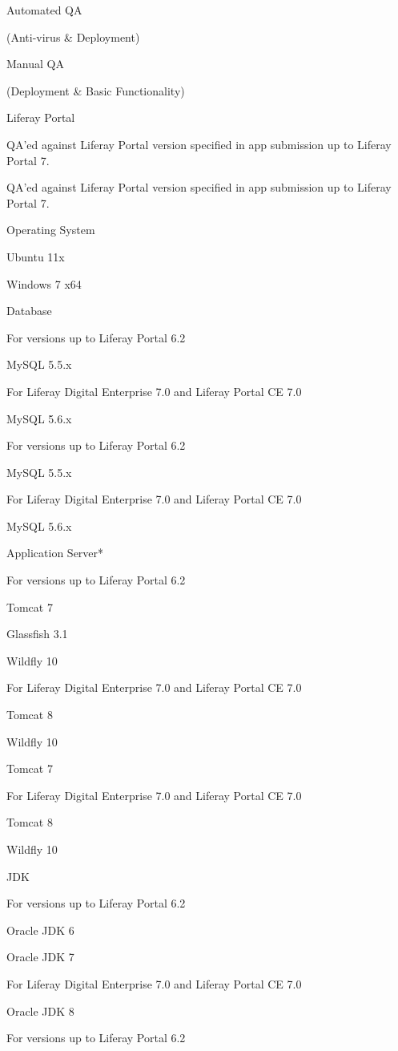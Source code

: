\label{article-33460919}
Automated QA

(Anti-virus \& Deployment)

Manual QA

(Deployment \& Basic Functionality)

Liferay Portal

QA'ed against Liferay Portal version specified in app submission up to
Liferay Portal 7.

QA'ed against Liferay Portal version specified in app submission up to
Liferay Portal 7.

Operating System

Ubuntu 11x

Windows 7 x64

Database

{For versions up to Liferay Portal 6.2}

MySQL 5.5.x

{For Liferay Digital Enterprise 7.0 and Liferay Portal CE 7.0}

MySQL 5.6.x

{For versions up to Liferay Portal 6.2}

MySQL 5.5.x

{For Liferay Digital Enterprise 7.0 and Liferay Portal CE 7.0}

MySQL 5.6.x

Application Server*

{For versions up to Liferay Portal 6.2}

Tomcat 7

Glassfish 3.1

Wildfly 10

{For Liferay Digital Enterprise 7.0 and Liferay Portal CE 7.0}

Tomcat 8

Wildfly 10

Tomcat 7

{For Liferay Digital Enterprise 7.0 and Liferay Portal CE 7.0}

Tomcat 8

Wildfly 10

JDK

{For versions up to Liferay Portal 6.2}

Oracle JDK 6

Oracle JDK 7

{For Liferay Digital Enterprise 7.0 and Liferay Portal CE 7.0}

Oracle JDK 8

{For versions up to Liferay Portal 6.2}

